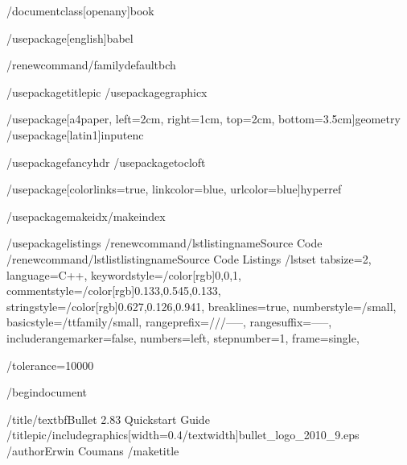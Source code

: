 


/documentclass[openany]{book}

/usepackage[english]{babel}

/renewcommand{/familydefault}{bch}%


/usepackage{titlepic}
/usepackage{graphicx}

/usepackage[a4paper, left=2cm, right=1cm,  top=2cm, bottom=3.5cm]{geometry}
/usepackage[latin1]{inputenc}

/usepackage{fancyhdr}
/usepackage{tocloft}


/usepackage[colorlinks=true, linkcolor=blue, urlcolor=blue]{hyperref}

/usepackage{makeidx}/makeindex

/usepackage{listings}
/renewcommand{/lstlistingname}{Source Code}
/renewcommand{/lstlistlistingname}{Source Code Listings}
/lstset{
	tabsize=2,	language=C++, keywordstyle=/color[rgb]{0,0,1},
	 commentstyle=/color[rgb]{0.133,0.545,0.133},
     stringstyle=/color[rgb]{0.627,0.126,0.941},
      breaklines=true,
     numberstyle=/small,
	basicstyle=/ttfamily/small,
	rangeprefix=///-----,	rangesuffix=-----,
	includerangemarker=false,
	numbers=left,	stepnumber=1,
	frame=single,
}


/tolerance=10000


/begin{document}


%
	/title{/textbf{Bullet 2.83 Quickstart Guide}}
	/titlepic{/includegraphics[width=0.4/textwidth]{bullet_logo_2010_9.eps}}
%
	/author{Erwin Coumans}
	/maketitle



